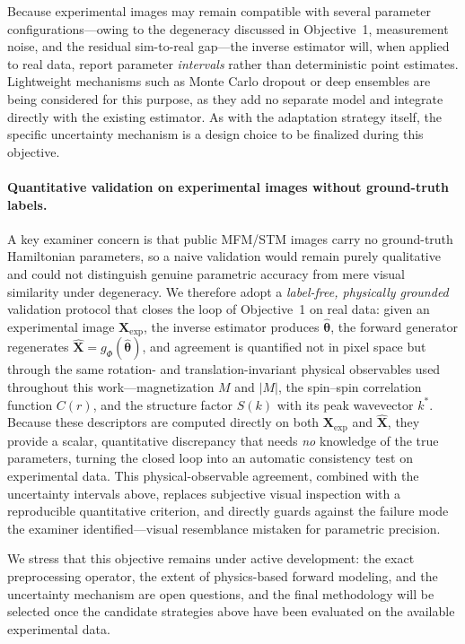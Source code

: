 \documentclass[letterpaper, 12, one column]{article}
\newcommand{\jc}[1]{\textcolor[rgb]{0.00,0.0,1.00}{#1}}
\begin{document}
Because experimental images may remain compatible with several parameter configurations---owing to the degeneracy discussed in Objective~1, measurement noise, and the residual sim-to-real gap---the inverse estimator will, when applied to real data, report parameter \emph{intervals} rather than deterministic point estimates. Lightweight mechanisms such as Monte Carlo dropout or deep ensembles are being considered for this purpose, as they add no separate model and integrate directly with the existing estimator. As with the adaptation strategy itself, the specific uncertainty mechanism is a design choice to be finalized during this objective.

\jc{\paragraph{Quantitative validation on experimental images without ground-truth labels.} A key examiner concern is that public MFM/STM images carry no ground-truth Hamiltonian parameters, so a naive validation would remain purely qualitative and could not distinguish genuine parametric accuracy from mere visual similarity under degeneracy. We therefore adopt a \emph{label-free, physically grounded} validation protocol that closes the loop of Objective~1 on real data: given an experimental image $\mathbf{X}_{\mathrm{exp}}$, the inverse estimator produces $\hat{\boldsymbol{\theta}}$, the forward generator regenerates $\hat{\mathbf{X}}=g_{\Phi}(\hat{\boldsymbol{\theta}})$, and agreement is quantified not in pixel space but through the same rotation- and translation-invariant physical observables used throughout this work---magnetization $M$ and $|M|$, the spin--spin correlation function $C(r)$, and the structure factor $S(k)$ with its peak wavevector $k^{\ast}$. Because these descriptors are computed directly on both $\mathbf{X}_{\mathrm{exp}}$ and $\hat{\mathbf{X}}$, they provide a scalar, quantitative discrepancy that needs \emph{no} knowledge of the true parameters, turning the closed loop into an automatic consistency test on experimental data. This physical-observable agreement, combined with the uncertainty intervals above, replaces subjective visual inspection with a reproducible quantitative criterion, and directly guards against the failure mode the examiner identified---visual resemblance mistaken for parametric precision.}

We stress that this objective remains under active development: the exact preprocessing operator, the extent of physics-based forward modeling, and the uncertainty mechanism are open questions, and the final methodology will be selected once the candidate strategies above have been evaluated on the available experimental data.
\end{document}
